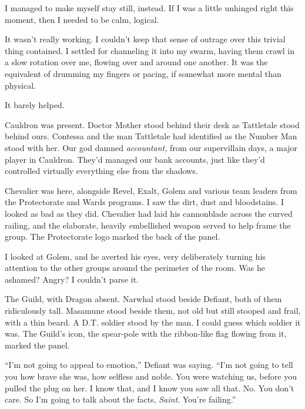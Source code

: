 I managed to make myself stay still, instead.  If I was a little unhinged right this moment, then I needed to be calm, logical.



It wasn't really working.  I couldn't keep that sense of outrage over this trivial thing contained.  I settled for channeling it into my swarm, having them crawl in a slow rotation over me, flowing over and around one another.  It was the equivalent of drumming my fingers or pacing, if somewhat more mental than physical.



It barely helped.



Cauldron was present.  Doctor Mother stood behind their desk as Tattletale stood behind ours.  Contessa and the man Tattletale had identified as the Number Man stood with her.  Our god damned \emph{accountant, }from our supervillain days, a major player in Cauldron.  They'd managed our bank accounts, just like they'd controlled virtually everything else from the shadows.



Chevalier was here, alongside Revel, Exalt, Golem and various team leaders from the Protectorate and Wards programs.  I saw the dirt, dust and bloodstains.  I looked as bad as they did.  Chevalier had laid his cannonblade across the curved railing, and the elaborate, heavily embellished weapon served to help frame the group.  The Protectorate logo marked the back of the panel.



I looked at Golem, and he averted his eyes, very deliberately turning his attention to the other groups around the perimeter of the room.  Was he ashamed?  Angry?  I couldn't parse it.



The Guild, with Dragon absent.  Narwhal stood beside Defiant, both of them ridiculously tall.  Masamune stood beside them, not old but still stooped and frail, with a thin beard.  A D.T. soldier stood by the man.  I could guess which soldier it was.  The Guild's icon, the spear-pole with the ribbon-like flag flowing from it, marked the panel.



``\ldotsand I'm not going to appeal to emotion,'' Defiant was saying.  ``I'm not going to tell you how brave she was, how selfless and noble.  You were watching us, before you pulled the plug on her.  I know that, and I know you saw all that.  No.  You don't care.  So I'm going to talk about the facts, \emph{Saint}.  You're failing.''



